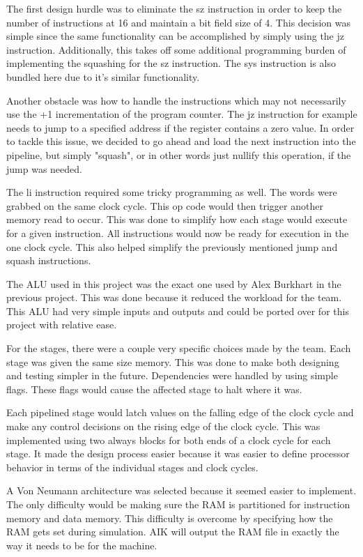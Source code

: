 \documentclass[conference]{IEEEtran}
\begin{document}
The first design hurdle was to eliminate the sz instruction in order to keep the number of instructions at 16 and maintain a bit field size of 4.  This decision was simple since the same functionality can be accomplished by simply using the jz instruction.  Additionally, this takes off some additional programming burden of implementing the squashing for the sz instruction.  The sys instruction is also bundled here due to it's similar functionality.

Another obstacle was how to handle the instructions which may not necessarily use the +1 incrementation of the program counter.  The jz instruction for example needs to jump to a specified address if the register contains a zero value.  In order to tackle this issue, we decided to go ahead and load the next instruction into the pipeline, but simply "squash", or in other words just nullify this operation, if the jump was needed.

The li instruction required some tricky programming as well. The words were grabbed on the same clock cycle. This op code would then trigger another memory read to occur. This was done to simplify how each stage would execute for a given instruction. All instructions would now be ready for execution in the one clock cycle. This also helped simplify the previously mentioned jump and squash instructions.

The ALU used in this project was the exact one used by Alex Burkhart in the previous project. This was done because it reduced the workload for the team. This ALU had very simple inputs and outputs and could be ported over for this project with relative ease. 

For the stages, there were a couple very specific choices made by the team. Each stage was given the same size memory. This was done to make both designing and testing simpler in the future. Dependencies were handled by using simple flags. These flags would cause the affected stage to halt where it was. 

Each pipelined stage would latch values on the falling edge of the clock cycle and make any control decisions on the rising edge of the clock cycle.
This was implemented using two always blocks for both ends of a clock cycle for each stage. 
It made the design process easier because it was easier to define processor behavior in terms of the individual stages and clock cycles.

A Von Neumann architecture was selected because it seemed easier to implement.
The only difficulty would be making sure the RAM is partitioned for instruction memory and data memory.
This difficulty is overcome by specifying how the RAM gets set during simulation.
AIK will output the RAM file in exactly the way it needs to be for the machine.
\end{document}
